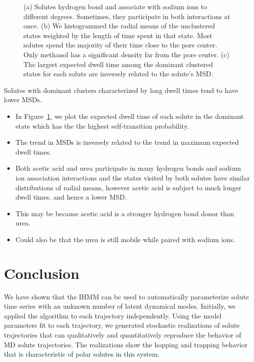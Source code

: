 \documentclass[journal=jpcbfk,manuscript=article]{achemso}
\begin{document}
\begin{figure}
\begin{subfigure}{0.325\textwidth}
  \caption{}\label{fig:dwell_time_summary}
  \end{subfigure}
  \caption{(a) Solutes hydrogen bond and associate with sodium ions
  to different degrees. Sometimes, they participate in both interactions at
  once. (b) We histogrammed the radial means of the unclustered states weighted
  by the length of time spent in that state. Most solutes spend the majority of
  their time close to the pore center. Only methanol has a significant density
  far from the pore center. (c) The largest expected dwell time among the dominant 
  clustered states for each solute are inversely related to the solute's MSD. 
  }\label{fig:summaries}
  \end{figure}
  
  Solutes with dominant clusters characterized by long dwell times tend to 
  have lower MSDs.
  \begin{itemize}
    \item In Figure~\ref{fig:dwell_time_summary}, we plot the expected dwell
    time of each solute in the dominant state which has the the highest
    self-transition probability. 
    \item The trend in MSDs is inversely related to the trend in maximum
    expected dwell times.
    \item Both acetic acid and urea participate in many hydrogen bonds and
    sodium ion association interactions and the states visited by both solutes
    have similar distributions of radial means, however acetic acid is 
    subject to much longer dwell times, and hence a lower MSD.
    \item This may be because acetic acid is a stronger hydrogen bond donor
    than urea. 
    \item Could also be that the urea is still mobile while paired with sodium ions.
  \end{itemize}
  
  \section{Conclusion}
  
  We have shown that the IHMM can be used to automatically parameterize solute 
  time series with an unknown number of latent dynamical modes. Initially, we applied
  the algorithm to each trajectory independently. Using the model parameters fit
  to each trajectory, we generated stochastic realizations of solute trajectories that
  can qualitatively and quantitatively reproduce the behavior of MD solute 
  trajectories. The realizations show the hopping and trapping behavior that is
  characteristic of polar solutes in this system. 
  
\end{document}
